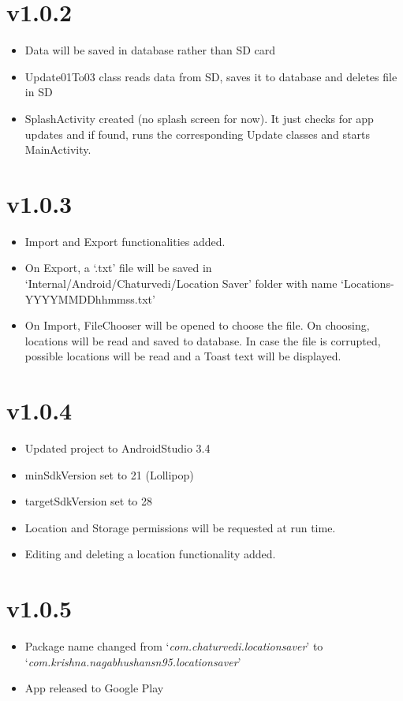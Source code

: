 \documentclass{article}
\begin{document}
\section{v1.0.2}
\begin{itemize}
\item Data will be saved in database rather than SD card
\item Update01To03 class reads data from SD, saves it to database and deletes file in SD
\item SplashActivity created (no splash screen for now). It just checks for app updates and if found, runs the corresponding Update classes and starts MainActivity.
\end{itemize}

\section{v1.0.3}
\begin{itemize}
\item Import and Export functionalities added.
\item On Export, a `.txt' file will be saved in `Internal/Android/Chaturvedi/Location Saver' folder with name `Locations-YYYYMMDDhhmmss.txt'
\item On Import, FileChooser will be opened to choose the file. On choosing, locations will be read and saved to database. In case the file is corrupted, possible locations will be read and a Toast text will be displayed.
\end{itemize}

\section{v1.0.4}
\begin{itemize}
\item Updated project to AndroidStudio 3.4
\item minSdkVersion set to 21 (Lollipop)
\item targetSdkVersion set to 28
\item Location and Storage permissions will be requested at run time.
\item Editing and deleting a location functionality added.
\end{itemize}

\section{v1.0.5}
\begin{itemize}
\item Package name changed from `\textit{com.chaturvedi.locationsaver}' to `\textit{com.krishna.nagabhushansn95.locationsaver}'
\item App released to Google Play
\end{itemize}
\end{document}
